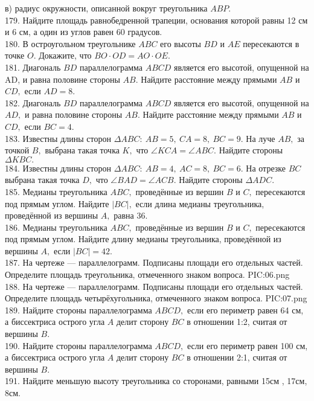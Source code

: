 в) радиус окружности, описанной вокруг треугольника $ABP.$\\
179. Найдите площадь равнобедренной трапеции, основания которой равны 12 см и 6 см, а один из углов равен 60 градусов.\\
180. В остроугольном треугольнике $ABC$ его высоты $BD$ и $AE$ пересекаются в точке $O.$ Докажите, что $BO\cdot OD=AO\cdot OE.$\\
181. Диагональ $BD$ параллелограмма $ABCD$ является его высотой, опущенной на AD, и равна половине стороны $AB.$ Найдите расстояние между прямыми $AB$ и $CD,$ если $AD = 8.$\\
182. Диагональ $BD$ параллелограмма $ABCD$ является его высотой, опущенной на $AD,$ и равна половине стороны $AB.$ Найдите расстояние между прямыми $AB$ и $CD,$ если $BC = 4.$\\
183. Известны длины сторон $\Delta ABC:\ AB = 5,\ CA = 8,\  BC = 9.$ На луче $AB,$ за точкой $B,$ выбрана такая точка $K,$ что $\angle KCA = \angle ABC.$ Найдите стороны $\Delta KBC.$\\
184. Известны длины сторон $\Delta ABC:\ AB = 4,\ AC = 8,\  BC = 6.$ На отрезке $BC$ выбрана такая точка $D,$ что $\angle BAD = \angle ACB.$ Найдите стороны $\Delta ADC.$\\
185. Медианы треугольника $ABC,$ проведённые из вершин $B$ и $C,$ пересекаются под прямым углом. Найдите $|BC|,$ если длина медианы треугольника, проведённой из вершины $A,$ равна 36.\\
186. Медианы треугольника $ABC,$ проведённые из вершин $B$ и $C,$ пересекаются под прямым углом. Найдите длину медианы треугольника, проведённой из вершины $A,$ если $|BC| = 42.$\\
187. На чертеже --- параллелограмм. Подписаны площади его отдельных частей. Определите площадь треугольника, отмеченного знаком вопроса.
{{PIC:06.png}}\\
188. На чертеже --- параллелограмм. Подписаны площади его отдельных частей. Определите площадь четырёхугольника, отмеченного знаком вопроса.
{{PIC:07.png}}\\
189. Найдите стороны параллелограмма $ABCD,$ если его периметр равен 64 см, а биссектриса острого угла $A$ делит сторону $BC$ в отношении 1:2, считая от вершины $B.$\\
190. Найдите стороны параллелограмма $ABCD,$ если его периметр равен 100 см, а биссектриса острого угла $A$ делит сторону $BC$ в отношении 2:1, считая от вершины $B.$\\
191. Найдите меньшую высоту треугольника со сторонами, равными 15см , 17см, 8см.\\

